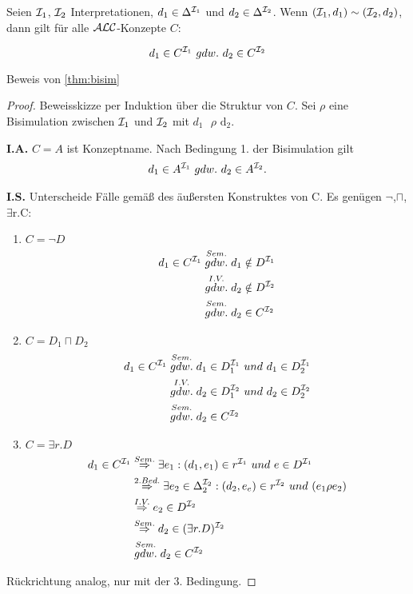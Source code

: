 \begin{theorem}[Bisimulationstheorem]
    \label{thm:bisim}
Seien $\mathcal{I}_1$, $\mathcal{I}_2$ Interpretationen,
$d_1 \in \Delta^{\mathcal{I}_1}$ und $d_2 \in \Delta^{\mathcal{I}_2}$. Wenn
$(\mathcal{I}_1,d_1) \sim (\mathcal{I}_2,d_2)$, dann gilt für alle $\mathcal{A}\mathcal{L}\mathcal{C}$-Konzepte
$C$:

$$d_1 \in C^{\mathcal{I}_1}\ gdw.\ d_2 \in C^{\mathcal{I}_2}$$
\end{theorem}

\begin{tafel} Beweis von \autoref{thm:bisim}
\begin{proof}
Beweisskizze per Induktion über die Struktur von $C$. Sei $\rho$ eine
Bisimulation zwischen $\mathcal{I}_1$ und $\mathcal{I}_2$ mit
$d_1\text{\ $\rho$}\text{\ d}_2$.

\textbf{I.A.} $C = A$ ist Konzeptname. Nach Bedingung 1. der
Bisimulation gilt
\begin{align*}
    d_1 \in A^{\mathcal{I}_1}\ gdw.\ d_2 \in A^{\mathcal{I}_2}.
\end{align*}


\textbf{I.S.} Unterscheide Fälle gemäß des äußersten Konstruktes von C.
Es genügen $\neg$,$\sqcap$, $\exists\text{r.C}$:

\begin{enumerate}
\item
  $C = \neg D$
    \begin{align*}
        d_1 \in C^{\mathcal{I}_1} &\stackrel{Sem.}{gdw.} d_1 \notin D^{\mathcal{I}_1}\\
        &\stackrel{I.V.}{gdw.} d_2 \notin D^{\mathcal{I}_2} \\
        &\stackrel{Sem.}{gdw.} d_2 \in C^{\mathcal{I}_2}
    \end{align*}
\item $C = D_1 \sqcap D_2$
  \begin{align*}
d_1 \in C^{\MI_1} &\stackrel{Sem.}{gdw.} d_1 \in D_1^{\MI_1}\ und\ d_1 \in D_2^{\MI_1}\\
&\stackrel{I.V.}{gdw.} d_2 \in D_1^{\MI_2}\ und\ d_2 \in D_2^{\MI_2} \\
&\stackrel{Sem.}{gdw.} d_2 \in C^{\MI_2}
\end{align*}

\item $C = \exists r.D$
  \begin{align*}
d_1 \in C^{\mathcal{I}_1} &\stackrel{Sem.}{\Rightarrow} \exists e_1 : (d_1,e_1) \in r^{\mathcal{I}_1}\ und\ e \in D^{\mathcal{I}_1}\\
&\stackrel{2.Bed.}{\Rightarrow} \exists e_2 \in \Delta_2^{\mathcal{I}_2}: (d_2,e_e) \in r^{\mathcal{I}_2}\ und\ (e_1 \rho e_2) \\
&\stackrel{I.V.}{\Rightarrow} e_2 \in D^{\mathcal{I}_2} \\
&\stackrel{Sem.}{\Rightarrow} d_2 \in (\exists r.D)^{\mathcal{I}_2} \\
&\stackrel{Sem.}{gdw.} d_2 \in C^{\mathcal{I}_2}
\end{align*}
\end{enumerate}
Rückrichtung analog, nur mit der 3. Bedingung.
\end{proof}
\end{tafel}

